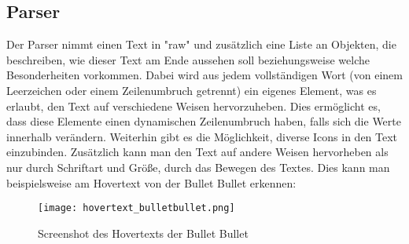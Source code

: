 
\renewcommand{\kapitelautor}{Autor: Felix Zwickelstorfer}
\subsection{Parser}\label{subsec:parser}
\renewcommand{\kapitelautor}{Autor: Felix Zwickelstorfer}

Der Parser nimmt einen Text in "raw" und zusätzlich eine Liste an Objekten, die beschreiben, wie dieser Text am Ende aussehen soll beziehungsweise welche Besonderheiten vorkommen.
Dabei wird aus jedem vollständigen Wort (von einem Leerzeichen oder einem Zeilenumbruch getrennt) ein eigenes Element, was es erlaubt, den Text auf verschiedene Weisen hervorzuheben.
Dies ermöglicht es, dass diese Elemente einen dynamischen Zeilenumbruch haben, falls sich die Werte innerhalb verändern.
Weiterhin gibt es die Möglichkeit, diverse Icons in den Text einzubinden.
Zusätzlich kann man den Text auf andere Weisen hervorheben als nur durch Schriftart und Größe, \zB durch das Bewegen des Textes.
Dies kann man beispielsweise am Hovertext von der Bullet Bullet erkennen:
\begin{figure}[H]
    \centering
    \texttt{[image: hovertext\_bulletbullet.png]}
    \caption{Screenshot des Hovertexts der Bullet Bullet}
\end{figure}